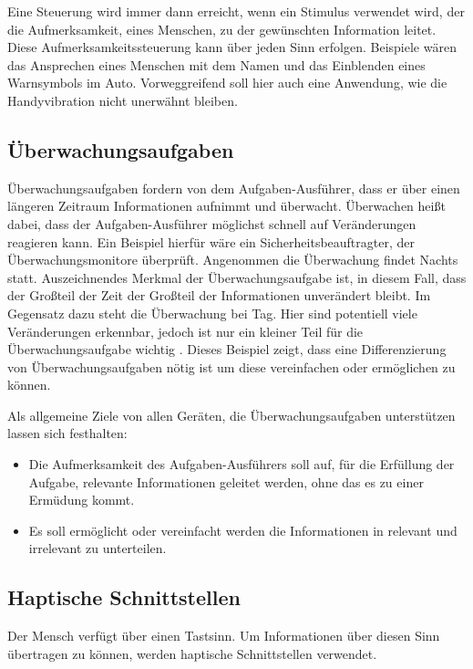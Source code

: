 \documentclass{llncs}					%
\begin{document}
Eine Steuerung wird immer dann erreicht, wenn ein Stimulus verwendet wird, der die Aufmerksamkeit, eines Menschen, zu der gewünschten Information leitet. Diese Aufmerksamkeitssteuerung kann über jeden Sinn erfolgen. Beispiele wären das Ansprechen eines Menschen mit dem Namen und das Einblenden eines Warnsymbols im Auto. Vorweggreifend soll hier auch eine Anwendung, wie die Handyvibration nicht unerwähnt bleiben.

\subsection{Überwachungsaufgaben}
Überwachungsaufgaben fordern von dem Aufgaben-Ausführer, dass er über einen längeren Zeitraum Informationen aufnimmt und überwacht. Überwachen heißt dabei, dass der Aufgaben-Ausführer möglichst schnell auf Veränderungen reagieren kann.
Ein Beispiel hierfür wäre ein Sicherheitsbeauftragter, der Überwachungsmonitore überprüft.
Angenommen die Überwachung findet Nachts statt. Auszeichnendes Merkmal der Überwachungsaufgabe ist, in diesem Fall, dass der Großteil der Zeit der Großteil der Informationen unverändert bleibt.
Im Gegensatz dazu steht die Überwachung bei Tag. Hier sind potentiell viele Veränderungen erkennbar, jedoch ist nur ein kleiner Teil für die Überwachungsaufgabe wichtig \cite{doi:10.1177/001872087902100109}.
Dieses Beispiel zeigt, dass eine Differenzierung von Überwachungsaufgaben nötig ist um diese vereinfachen oder ermöglichen zu können.

Als allgemeine Ziele von allen Geräten, die Überwachungsaufgaben unterstützen lassen sich festhalten:
\begin{itemize}
	\item Die Aufmerksamkeit  des Aufgaben-Ausführers soll auf, für die Erfüllung der Aufgabe, relevante Informationen geleitet werden, ohne das es zu einer Ermüdung kommt.
	\item Es soll ermöglicht oder vereinfacht werden die Informationen in relevant und irrelevant zu unterteilen.
\end{itemize}

\subsection{Haptische Schnittstellen}
Der Mensch verfügt über einen Tastsinn. Um Informationen über diesen Sinn übertragen zu können, werden haptische Schnittstellen verwendet. 

 
\end{document}
